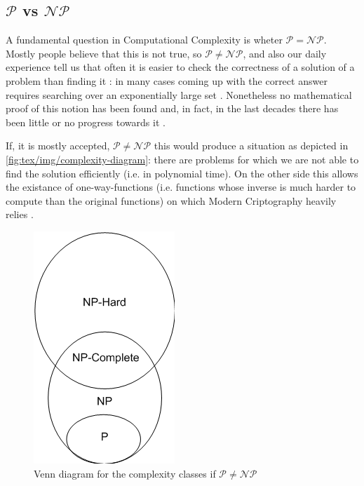 \subsection{$\mathcal{P} $ vs $\mathcal{NP}$}%
\label{sub:_p_vs_np_}

A fundamental question in Computational Complexity is wheter $\mathcal{P} =
	\mathcal{NP} $. Mostly people believe that this is not true, so
$\mathcal{P} \neq \mathcal{NP} $, and also our daily experience tell us that
often it is easier to check the correctness of a solution of a problem than
finding it \cite{9780521884730}: in many cases coming up with the correct
answer requires searching over an exponentially large set
\cite{SanjeevArora2017}. Nonetheless no mathematical proof of this notion has
been found and, in fact, in the last decades there has been little or no progress towards it \cite{Erickson2019}.

If, it is mostly accepted, $\mathcal{P} \neq \mathcal{NP} $ this would produce
a situation as depicted in \autoref{fig:tex/img/complexity-diagram}:
there are problems for which we are not able to find the solution
efficiently (i.e. in polynomial time). On the other side this allows the
existance of one-way-functions (i.e. functions whose inverse is much harder to
compute than the original functions) on which Modern Criptography heavily
relies \cite{9780521884730}.
%


\begin{figure}
	\centering
	\includegraphics[width=0.3\linewidth]{tex/img/complexity-diagram.png}
	\caption{Venn diagram for the complexity classes if $\mathcal{P} \neq
			\mathcal{NP} $ \cite{article}}%
	\label{fig:tex/img/complexity-diagram}
\end{figure}


